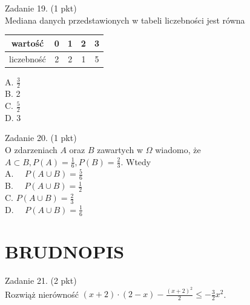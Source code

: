 \documentclass[10pt]{article}
\begin{document}
Zadanie 19. (1 pkt)\\
Mediana danych przedstawionych w tabeli liczebności jest równa

\begin{center}
\begin{tabular}{|c|c|c|c|c|}
\hline
wartość & 0 & 1 & 2 & 3 \\
\hline
liczebność & 2 & 2 & 1 & 5 \\
\hline
\end{tabular}
\end{center}

A. \(\frac{3}{2}\)\\
B. 2\\
C. \(\frac{5}{2}\)\\
D. 3

Zadanie 20. (1 pkt)\\
O zdarzeniach \(A\) oraz \(B\) zawartych w \(\Omega\) wiadomo, że \(A \subset B, P(A)=\frac{1}{6}, P(B)=\frac{2}{3}\). Wtedy\\
A. \(\quad P(A \cup B)=\frac{5}{6}\)\\
B. \(\quad P(A \cup B)=\frac{1}{2}\)\\
C. \(P(A \cup B)=\frac{2}{3}\)\\
D. \(\quad P(A \cup B)=\frac{1}{6}\)

\section*{BRUDNOPIS}
Zadanie 21. (2 pkt)\\
Rozwiąż nierówność \((x+2) \cdot(2-x)-\frac{(x+2)^{2}}{2} \leq-\frac{3}{2} x^{2}\).
\end{document}
